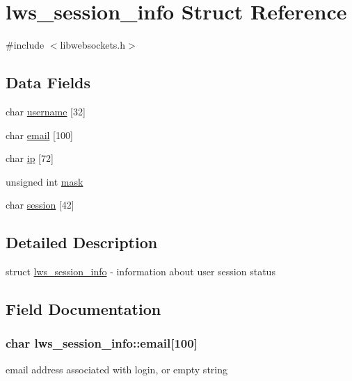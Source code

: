 \hypertarget{structlws__session__info}{}\section{lws\+\_\+session\+\_\+info Struct Reference}
\label{structlws__session__info}


{\ttfamily \#include $<$libwebsockets.\+h$>$}

\subsection*{Data Fields}
\begin{DoxyCompactItemize}
\item 
char \hyperlink{structlws__session__info_a3d57a70b6e7181d95a8bec429b1a7697}{username} \mbox{[}32\mbox{]}
\item 
char \hyperlink{structlws__session__info_a94b813cfc6b0da4b182659de30038ad3}{email} \mbox{[}100\mbox{]}
\item 
char \hyperlink{structlws__session__info_a53eed02325e8717a53297391e3e98fac}{ip} \mbox{[}72\mbox{]}
\item 
unsigned int \hyperlink{structlws__session__info_afb924864b70f40372920688a5c1c895e}{mask}
\item 
char \hyperlink{structlws__session__info_a4353b5dd19400b2b15edfd7cee1e4cd5}{session} \mbox{[}42\mbox{]}
\end{DoxyCompactItemize}


\subsection{Detailed Description}
struct \hyperlink{structlws__session__info}{lws\+\_\+session\+\_\+info} -\/ information about user session status 

\subsection{Field Documentation}
\subsubsection[{\texorpdfstring{email}{email}}]{\setlength{\rightskip}{0pt plus 5cm}char lws\+\_\+session\+\_\+info\+::email\mbox{[}100\mbox{]}}\hypertarget{structlws__session__info_a94b813cfc6b0da4b182659de30038ad3}{}\label{structlws__session__info_a94b813cfc6b0da4b182659de30038ad3}
email address associated with login, or empty string 
